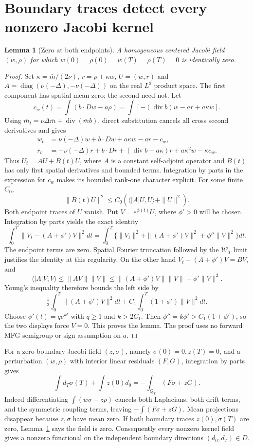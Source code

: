 \documentclass[11pt,a4paper]{article}
\newtheorem{lemma}[theorem]{Lemma}
\begin{document}
\section{Boundary traces detect every nonzero Jacobi kernel}
\begin{lemma}[Zero at both endpoints]\label{doublezero}
A homogeneous centered Jacobi field $(w,\rho)$ for which
$w(0)=\rho(0)=w(T)=\rho(T)=0$ is identically zero.
\end{lemma}
\begin{proof}
Set $\kappa=\bar m/(2\nu)$, $r=\rho+\kappa w$, $U=(w,r)$ and
$A=\operatorname{diag}(\nu(-\Delta),-\nu(-\Delta))$ on the real
$L^2$ product space. The first component has spatial mean zero; the
second need not. Let
\[
 c_w(t)=\int(b\cdot Dw-a\rho)
       =\int[-(\operatorname{div}b)w-ar+a\kappa w].
\]
Using $\bar m_t=\nu\Delta\bar m+\operatorname{div}(\bar m b)$,
direct substitution cancels all cross second derivatives and gives
\begin{align*}
 w_t&=\nu(-\Delta)w+b\cdot Dw+a\kappa w-ar-c_w,\\
 r_t&=-\nu(-\Delta)r+b\cdot Dr+
           (\operatorname{div}b-a\kappa)r+a\kappa^2w-\kappa c_w.
\end{align*}
Thus $U_t=AU+B(t)U$, where $A$ is a constant self-adjoint operator
and $B(t)$ has only first spatial derivatives and bounded terms.
Integration by parts in the expression for $c_w$ makes its bounded
rank-one character explicit. For some finite $C_0$,
\[
 \|B(t)U\|^2\leq C_0(\langle |A|U,U\rangle+\|U\|^2).
\]
Both endpoint traces of $U$ vanish. Put $V=e^{\phi(t)}U$, where
$\phi'>0$ will be chosen. Integration by parts yields the exact identity
\[
 \int_0^T\|V_t-(A+\phi')V\|^2dt
 =\int_0^T\{\|V_t\|^2+\|(A+\phi')V\|^2
                              +\phi''\|V\|^2\}dt.
\]
The endpoint terms are zero. Spatial Fourier truncation followed by
the $\mathcal W_T$ limit justifies the identity at this regularity.
On the other hand $V_t-(A+\phi')V=BV$, and
\[
 \langle|A|V,V\rangle\leq\|AV\|\|V\|
 \leq\|(A+\phi')V\|\|V\|+\phi'\|V\|^2.
\]
Young's inequality therefore bounds the left side by
\[
 \tfrac12\int_0^T\|(A+\phi')V\|^2dt
            +C_1\int_0^T(1+\phi')\|V\|^2dt.
\]
Choose $\phi'(t)=q e^{kt}$ with $q\geq1$ and $k>2C_1$.
Then $\phi''=k\phi'>C_1(1+\phi')$, so the two displays force
$V=0$. This proves the lemma. The proof uses no forward MFG
semigroup or sign assumption on $a$.
\end{proof}

For a zero-boundary Jacobi field $(z,\sigma)$, namely
$\sigma(0)=0,z(T)=0$, and a perturbation $(w,\rho)$ with interior
linear residuals $(F,G)$, integration by parts gives
\begin{equation}\tag{G1}\label{G1}
 \int d_T\sigma(T)+\int z(0)d_0
       =-\int_{Q_T}(F\sigma+zG).
\end{equation}
Indeed differentiating $\int(w\sigma-z\rho)$ cancels both Laplacians,
both drift terms, and the symmetric coupling terms, leaving
$-\int(F\sigma+zG)$. Mean projections disappear because $z,\sigma$
have mean zero. If both boundary traces $z(0),\sigma(T)$ are zero,
Lemma~\ref{doublezero} says the field is zero. Consequently every
nonzero kernel field gives a nonzero functional on the independent
boundary directions $(d_0,d_T)\in D$.
\end{document}
